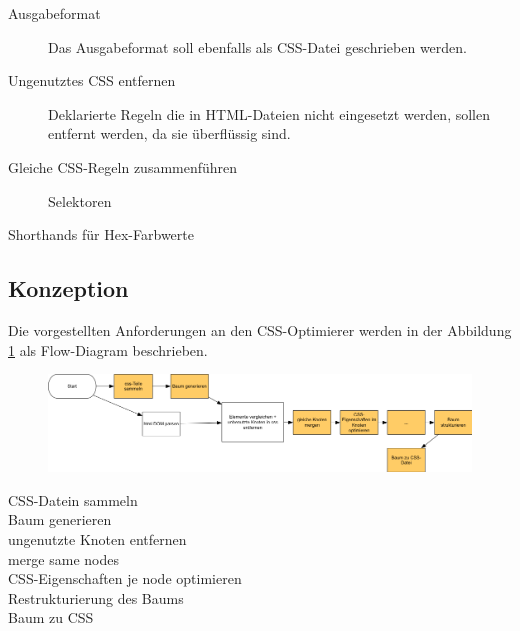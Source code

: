 \begin{description}
    \item[Ausgabeformat] Das Ausgabeformat soll ebenfalls als CSS-Datei geschrieben werden.
    
    \item[Ungenutztes CSS entfernen] Deklarierte Regeln die in HTML-Dateien nicht eingesetzt werden, sollen entfernt werden, da sie überflüssig sind.
    
    \item[Gleiche CSS-Regeln zusammenführen] Selektoren
    
    \item[Shorthands für Hex-Farbwerte] 
    
    \item[]
\end{description}

\subsection{Konzeption}

Die vorgestellten Anforderungen an den CSS-Optimierer werden in der Abbildung \ref{app-workflow} als Flow-Diagram beschrieben. 
 
\begin{figure}[h!]
\includegraphics[width=1.0\textwidth]{img/app-workflow.png}
\label{app-workflow}
\end{figure}

\begin{description}
    \item[CSS-Datein sammeln]

    \item[Baum generieren]
    
    \item[ungenutzte Knoten entfernen]
    
    \item[merge same nodes]
    
    \item[CSS-Eigenschaften je node optimieren]
    
    \item[Restrukturierung des Baums]
    
    \item[Baum zu CSS]    
\end{description}

